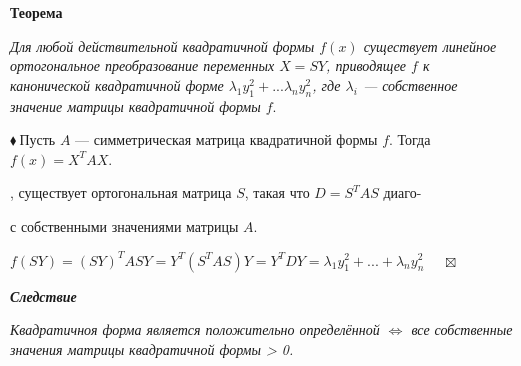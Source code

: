 \documentclass[a4paper, 12pt]{report}
\begin{document}
	
	\textbf{Теорема}
	\par
	\textit{Для любой действительной квадратичной формы $f(x)$ существует линейное ортогональное преобразование переменных $X=SY$, приводящее $f$ к канонической квадратичной форме $\lambda_1y_1^2 + ... \lambda_ny_n^2$, где $\lambda_i$ --- собственное значение матрицы квадратичной формы $f$}.
	\par\bigskip
	$\blacklozenge\ $Пусть $A$ --- симметрическая матрица квадратичной формы $f$. Тогда $f(x)=X^TAX$.
	
	, существует ортогональная матрица $S$, такая что $D=S^TAS$ диаго-
	
	 с собственными значениями матрицы $A$.
	
	 $f(SY)=(SY)^TASY=Y^T(S^TAS)Y=Y^TDY=\lambda_1y_1^2 + ... + \lambda_ny_n^2$
	$ \quad \boxtimes$
	\par\bigskip
	\textit{\textbf{Следствие}}
	\par
	\textit{Квадратичноя форма является положительно определённой $\Longleftrightarrow$ все собственные значения матрицы квадратичной формы > 0.}
	
	
	
	
	
	
	
\end{document}
